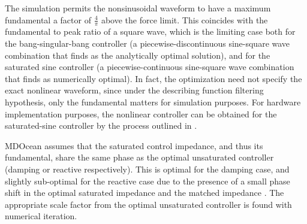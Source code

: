 The simulation permits the nonsinusoidal waveform to have a maximum fundamental a factor of $\frac{4}{\pi}$ above the force limit.
This coincides with the fundamental to peak ratio of a square wave, which is the limiting case both for the bang-singular-bang controller (a piecewise-discontinuous sine-square wave combination that \cite{hendrikx_optimal_2017} finds as the analytically optimal solution), and for the saturated sine controller (a piecewise-continuous sine-square wave combination that \cite{coe_initial_2020} finds as numerically optimal).
In fact, the optimization need not specify the exact nonlinear waveform, since under the describing function filtering hypothesis, only the fundamental matters for simulation purposes.
For hardware implementation purposes, the nonlinear controller can be obtained for the saturated-sine controller by the process outlined in \cite{mccabe_force-limited_2024}. 

MDOcean assumes that the saturated control impedance, and thus its fundamental, share the same phase as the optimal unsaturated controller (damping or reactive respectively).
This is optimal for the damping case, and slightly sub-optimal for the reactive case due to the presence of a small phase shift in the optimal saturated impedance and the matched impedance \cite{mccabe_force-limited_2024}.
The appropriate scale factor from the optimal unsaturated controller is found with numerical iteration. 

    

